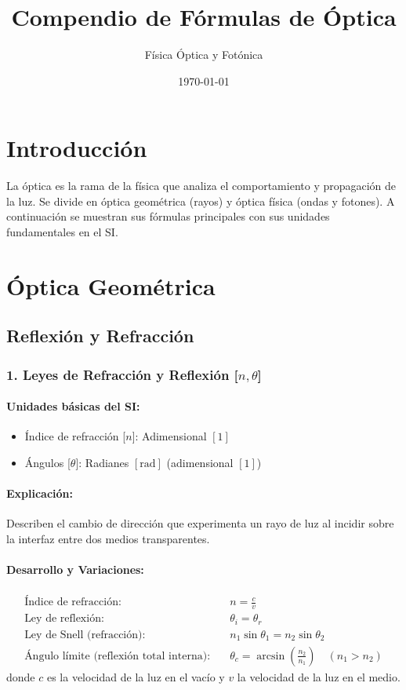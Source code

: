 \documentclass[12pt,a4paper]{article}
\title{\textbf{Compendio de Fórmulas de Óptica}}
\author{Física Óptica y Fotónica}
\date{\today}
\begin{document}
\maketitle

\section*{Introducción}
La óptica es la rama de la física que analiza el comportamiento y propagación de la luz. Se divide en óptica geométrica (rayos) y óptica física (ondas y fotones). A continuación se muestran sus fórmulas principales con sus unidades fundamentales en el SI.

\section{Óptica Geométrica}

\subsection{Reflexión y Refracción}

\subsubsection*{1. Leyes de Refracción y Reflexión [$n, \theta$]}
\paragraph*{Unidades básicas del SI:}
\begin{itemize}
    \item Índice de refracción [$n$]: Adimensional $[1]$
    \item Ángulos [$\theta$]: Radianes $[\text{rad}]$ (adimensional $[1]$)
\end{itemize}
\paragraph*{Explicación:} Describen el cambio de dirección que experimenta un rayo de luz al incidir sobre la interfaz entre dos medios transparentes.
\paragraph*{Desarrollo y Variaciones:}
\begin{align*}
\text{Índice de refracción:} \quad & n = \frac{c}{v} \\
\text{Ley de reflexión:} \quad & \theta_i = \theta_r \\
\text{Ley de Snell (refracción):} \quad & n_1 \sin\theta_1 = n_2 \sin\theta_2 \\
\text{Ángulo límite (reflexión total interna):} \quad & \theta_c = \arcsin\left(\frac{n_2}{n_1}\right) \quad (n_1 > n_2)
\end{align*}
donde $c$ es la velocidad de la luz en el vacío y $v$ la velocidad de la luz en el medio.
\end{document}
